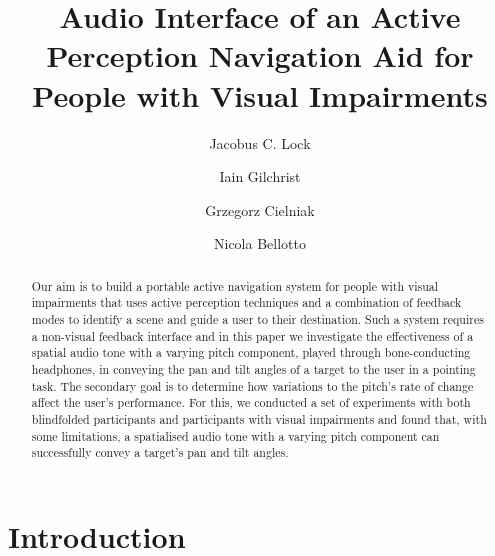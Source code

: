 \documentclass{llncs}
\begin{document}
\title{Audio Interface of an Active Perception Navigation Aid for People with Visual Impairments}

\author{Jacobus C. Lock \and 
Iain Gilchrist \and
Grzegorz Cielniak \and
Nicola Bellotto}



\maketitle

\begin{abstract}
	Our aim is to build a portable active navigation system for people with visual impairments that uses active perception techniques and a combination of feedback modes to identify a scene and guide a user to their destination.
	Such a system requires a non-visual feedback interface and in this paper we investigate the effectiveness of a spatial audio tone with a varying pitch component, played through bone-conducting headphones, in conveying the pan and tilt angles of a target to the user in a pointing task.
	The secondary goal is to determine how variations to the pitch's rate of change affect the user's performance.
	For this, we conducted a set of experiments with both blindfolded participants and participants with visual impairments and found that, with some limitations, a spatialised audio tone with a varying pitch component can successfully convey a target's pan and tilt angles. 
\end{abstract} 

\section{Introduction}
\end{document}
